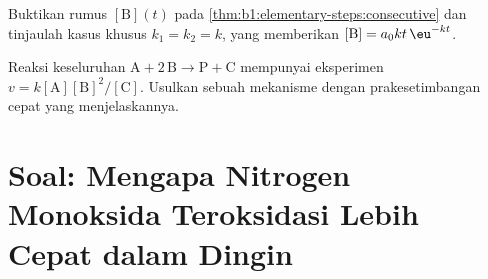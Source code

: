 \begin{exercise}[$\star\star\star$]\label{exo:b1:elementary-steps:11}
Buktikan rumus $[\mathrm{B}](t)$ pada
\cref{thm:b1:elementary-steps:consecutive} dan tinjaulah kasus khusus
$k_1 = k_2 = k$, yang memberikan $[\mathrm{B}] = a_0kt\,\eu^{-kt}$.
\end{exercise}

\begin{exercise}[$\star\star\star$]\label{exo:b1:elementary-steps:12}
Reaksi keseluruhan $\mathrm{A} + 2\,\mathrm{B} \to \mathrm{P} +
\mathrm{C}$ mempunyai  eksperimen $v =
k[\mathrm{A}][\mathrm{B}]^2/[\mathrm{C}]$. Usulkan sebuah mekanisme
dengan prakesetimbangan cepat yang menjelaskannya.
\end{exercise}

\section{Soal: Mengapa Nitrogen Monoksida Teroksidasi Lebih Cepat dalam Dingin}

